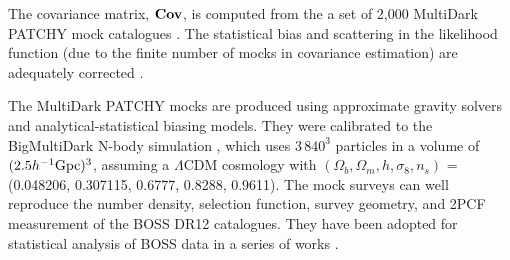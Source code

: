 \documentclass[iop]{emulateapj}
\begin{document}
The covariance matrix, ${\bf Cov}$, is computed from the a set of 2,000 MultiDark PATCHY mock catalogues \citep{MDPATCHY}.
The statistical bias and scattering in the likelihood function (due to the finite number of mocks in covariance estimation) 
are adequately corrected \citep{Hartlap,Percival2014}.

The MultiDark PATCHY  mocks are produced using approximate gravity solvers and analytical-statistical biasing models.
They were calibrated to the BigMultiDark N-body simulation \citep{K2014}, which 
uses $3\,840^3$ particles in a volume of $(2.5h^{-1}\rm Gpc)^3$,
assuming a $\Lambda$CDM cosmology with 
$(\Omega_{b},\Omega_{m},h,\sigma_8,n_s)$  = (0.048206, 0.307115, 0.6777, 0.8288, 0.9611). 
The mock surveys can well reproduce the number density, 
selection function, survey geometry, and 2PCF measurement of the BOSS DR12 catalogues.
They have been adopted for statistical analysis of BOSS data in a series of works \citep[see][and references therein]{Alam2016}.
\end{document}
